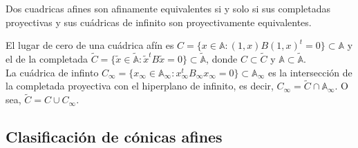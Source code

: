 \begin{teorema}
    Dos cuadricas afines son afinamente equivalentes si y solo si sus completadas proyectivas y sus cuádricas de infinito son proyectivamente equivalentes.
\end{teorema}

El lugar de cero de una cuádrica afín es $C = \{x \in \mathbb{A} : (1,x) B (1,x)^t = 0 \} \subset \mathbb{A}$ y el de la completada $\tilde{C} = \{ \tilde{x} \in \tilde{\mathbb{A}} : \tilde{x}^t B \tilde{x} = 0 \} \subset \tilde{\mathbb{A}}$, donde $C \subset \tilde{C}$ y $\mathbb{A} \subset \tilde{\mathbb{A}}$.\\
La cuádrica de infinto $C_\infty = \{x_\infty \in \mathbb{A}_\infty : x_\infty^t B_\infty x_\infty = 0 \} \subset \mathbb{A}_\infty$ es la intersección de la completada proyectiva con el hiperplano de infinito, es decir, $C_\infty = \tilde{C} \cap \mathbb{A}_\infty$. O sea, $\tilde{C} = C \cup C_\infty$.\\

\subsection{Clasificación de cónicas afines}

